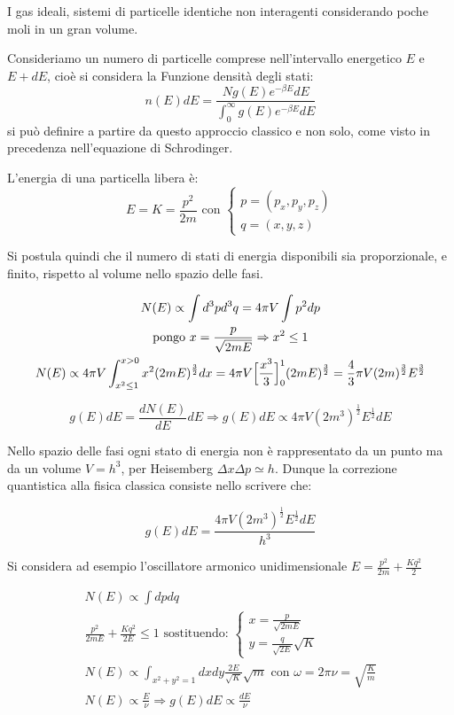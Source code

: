 \newpage

I gas ideali, sistemi di particelle identiche non interagenti considerando poche moli in un gran volume.

Consideriamo un numero di particelle comprese nell'intervallo energetico $E$ e $E+dE$, cioè si considera la Funzione densità degli stati:
$$ n(E)dE = \frac{N g(E) e^{-\beta E} dE}{\int_0^\infty g(E) e^{-\beta E} dE } $$
si può definire a partire da questo approccio classico e non solo, come visto in precedenza nell'equazione di Schrodinger.

L'energia di una particella libera è:
\begin{equation}
E = K = \frac{p^2}{2m}
\mbox{ con }
\begin{cases}
p = (p_x, p_y, p_z) \\
q = (x, y, z)
\end{cases}
\end{equation}

Si postula quindi che il numero di stati di energia disponibili sia proporzionale, e finito, rispetto al volume nello spazio delle fasi.

\begin{gather*} 
 N(E) \propto \int d^3 p d^3 q = 4 \pi V \int p^2 dp \\
\mbox{pongo }  x = \frac{p}{\sqrt{2 m E}} \Rightarrow x^2 \leq 1 \\
N(E) \propto 4 \pi V \int_{x^2 \le 1}^{x > 0} x^2 (2mE)^{\frac{3}{2}} dx = 4 \pi V \Bigl[ \frac{x^3}{3}  \Bigr]_0^1 (2mE)^{\frac{3}{2}} = \frac{4}{3} \pi V (2m)^{\frac{3}{2}} E^{\frac{3}{2}}
\end{gather*}

$$  g(E)dE = \frac{dN(E)}{dE}dE \Rightarrow g(E)dE \propto 4 \pi V (2m^3)^{\frac{1}{2}} E^{\frac{1}{2}} dE $$

Nello spazio delle fasi ogni stato di energia non è rappresentato da un punto ma da un volume $V = h^3$, per Heisemberg $\Delta x \Delta p \simeq h$.
Dunque la correzione quantistica alla fisica classica consiste nello scrivere che:


\begin{equation}\label{ge_de}
g(E) dE = \frac{4 \pi V (2m^3)^{\frac{1}{2}} E^{\frac{1}{2}} dE}{h^3}
\end{equation}


Si considera ad esempio l'oscillatore armonico unidimensionale $ E = \frac{p^2}{2m} + \frac{K q^2}{2} $

\begin{gather*} 
N(E) \propto \int dp dq \\
\frac{p^2}{2mE} + \frac{K q^2}{2E} \leq 1 \mbox{ sostituendo: } 
\begin{cases}
	x = \frac{p}{\sqrt{2mE}} \\
	y = \frac{q}{\sqrt{2E}} \sqrt{K}
\end{cases} \\
N(E) \propto \int_{x^2 + y^2 = 1} dx dy \frac{2E}{\sqrt{K}} \sqrt{m}  \mbox{ con } \omega = 2 \pi \nu = \sqrt{\frac{K}{m}} \\
N(E) \propto \frac{E}{\nu} \Rightarrow g(E)dE \propto \frac{dE}{\nu}
\end{gather*} 

